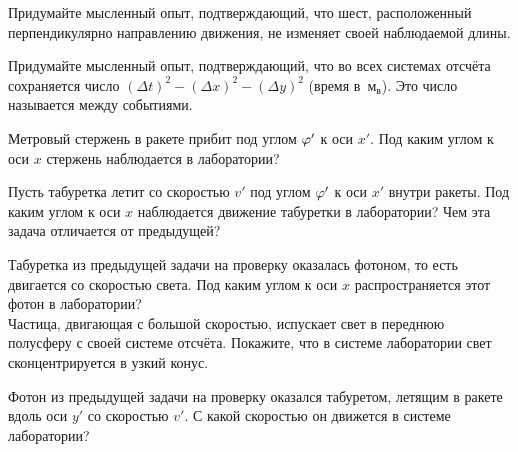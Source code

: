 \documentclass[a4paper,12pt]{article}
\newcommand{\мв}{\,м$_в$}
\begin{document}


Придумайте мысленный опыт, подтверждающий, что шест, расположенный перпендикулярно направлению движения, не изменяет своей наблюдаемой длины.

Придумайте мысленный опыт, подтверждающий, что во всех системах отсчёта сохраняется число $(\Delta t)^2 - (\Delta x)^2 - (\Delta y)^2$ (время в \мв). Это число называется  между событиями.

Метровый стержень в ракете прибит под углом $\varphi'$ к оси $x'$.
Под каким углом  к оси $x$ стержень наблюдается в лаборатории?

Пусть табуретка летит со скоростью $v'$ под углом $\varphi'$ к оси $x'$ внутри ракеты. Под каким углом  к оси $x$ наблюдается движение табуретки в лаборатории? Чем эта задача отличается от предыдущей?

Табуретка из предыдущей задачи на проверку оказалась фотоном, то есть двигается со скоростью света. Под каким углом к оси $x$ распространяется этот фотон в лаборатории?\\
Частица, двигающая с большой скоростью, испускает свет в переднюю полусферу с своей системе отсчёта. Покажите, что в системе лаборатории свет сконцентрируется в узкий конус.

Фотон из предыдущей задачи на проверку оказался табуретом, летящим в ракете вдоль оси $y'$ со скоростью $v'$. С какой скоростью он движется в системе лаборатории?
%
\end{document}
